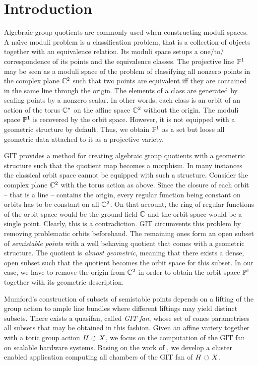 \chapter{Introduction}

Algebraic group quotients are commonly used when constructing moduli spaces. A na\"{\i}ve moduli problem is a classification problem, that is a collection of objects together with an equivalence relation. Its moduli space setups a one\=/to\=/correspondence of its points and the equivalence classes. The projective line $\mathbb{P}^1$ may be seen as a moduli space of the problem of classifying all nonzero points in the complex plane $\mathbb{C}^2$ such that two points are equivalent iff they are contained in the same line through the origin. The elements of a class are generated by scaling points by a nonzero scalar. In other words, each class is an orbit of an action of the torus $\mathbb{C}^*$ on the affine space $\mathbb{C}^2$ without the origin. The moduli space $\mathbb{P}^1$ is recovered by the orbit space. However, it is not equipped with a geometric structure by default. Thus, we obtain $\mathbb{P}^1$ as a set but loose all geometric data attached to it as a projective variety. 

\ac{GIT} provides a method for creating algebraic group quotients with a geometric structure such that the quotient map becomes a morphism. In many instances the classical orbit space cannot be equipped with such a structure. Consider the complex plane $\mathbb{C}^2$ with the torus action as above. Since the closure of each orbit -- that is a line -- contains the origin, every regular function being constant on orbits has to be constant on all $\mathbb{C}^2$. On that account, the ring of regular functions of the orbit space would be the ground field $\mathbb{C}$ and the orbit space would be a single point. Clearly, this is a contradiction. \ac{GIT} circumvents this problem by removing problematic orbits beforehand. The remaining ones form an open subset of \emph{semistable points} with a well behaving quotient that comes with a geometric structure. The quotient is \emph{almost geometric}, meaning that there exists a dense, open subset such that the quotient becomes the orbit space for this subset. In our case, we have to remove the origin from $\mathbb{C}^2$ in order to obtain the orbit space $\mathbb{P}^1$ together with its geometric description.

Mumford's construction of subsets of semistable points depends on a lifting of the group action to ample line bundles where different liftings may yield distinct subsets. There exists a quasifan, called \emph{GIT fan}, whose set of cones parametrises all subsets that may be obtained in this fashion. Given an affine variety together with a toric group action $H{\ \circlearrowleft\ } X$, we focus on the computation of the GIT fan on scalable hardware systems. Basing on the work of \citeauthor{gitfan_symmetry} \cite{gitfan_symmetry}, we develop a cluster enabled application computing all chambers of the GIT fan of $H{\ \circlearrowleft\ } X$.

